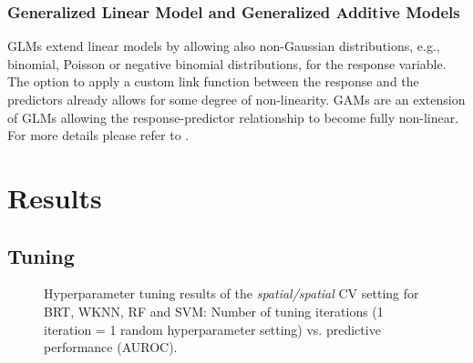 \documentclass[review]{elsarticle}
\begin{document}
\subsubsection{Generalized Linear Model and Generalized Additive Models}

\label{subsec:gam}

\ac{GLM}s extend linear models by allowing also non-Gaussian distributions, e.g., binomial, Poisson or negative binomial distributions, for the response variable.
The option to apply a custom link function between the response and the predictors already allows for some degree of non-linearity.
\ac{GAM}s are an extension of \ac{GLM}s allowing the response-predictor relationship to become fully non-linear.
For more details please refer to \cite{Zuur2009, mgcv, James2013}.

\section{Results}

\subsection{Tuning}

\begin{figure} [t!]
	\begin{center}
		\caption[]{Hyperparameter tuning results of the \emph{spatial/spatial} CV setting for \ac{BRT}, \ac{WKNN}, \ac{RF} and \ac{SVM}: Number of tuning iterations (1 iteration = 1 random hyperparameter setting) vs. predictive performance (AUROC).}
		\label{fig:iterations_vs_auroc}
	\end{center}
\end{figure}

\end{document}

